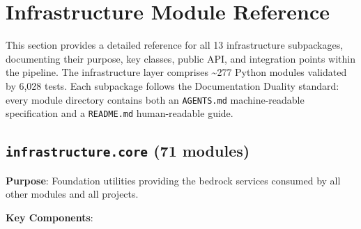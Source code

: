 \documentclass[
]{article}
\begin{document}
\newpage

\section{Infrastructure Module
Reference}\label{infrastructure-module-reference}

This section provides a detailed reference for all 13 infrastructure
subpackages, documenting their purpose, key classes, public API, and
integration points within the pipeline. The infrastructure layer
comprises \textasciitilde277 Python modules validated by 6,028 tests.
Each subpackage follows the Documentation Duality standard: every module
directory contains both an \texttt{AGENTS.md} machine-readable
specification and a \texttt{README.md} human-readable guide.

\subsection{\texorpdfstring{\texttt{infrastructure.core} (71
modules)}{infrastructure.core (71 modules)}}\label{infrastructure.core-71-modules}

\textbf{Purpose}: Foundation utilities providing the bedrock services
consumed by all other modules and all projects.

\textbf{Key Components}:
\end{document}
